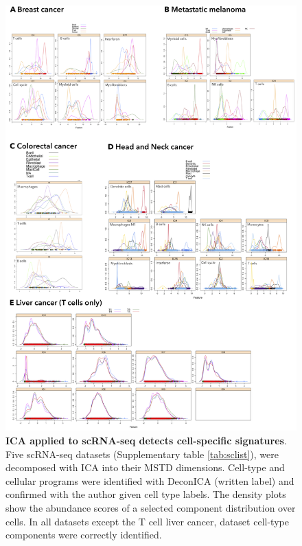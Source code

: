\documentclass[12pt,]{book}
\theoremstyle{definition}
\theoremstyle{definition}
\theoremstyle{definition}
\theoremstyle{remark}
\begin{document}
\begin{figure}

{\centering \includegraphics[width=1\linewidth]{figures-ext/scICA} 

}

\caption[ICA applied to scRNA-seq detects cell-specific signautures]{\textbf{ICA applied to scRNA-seq detects
cell-specific signatures}. Five scRNA-seq datasets (Supplementary table
\ref{tab:sclist}), were decomposed with ICA into their MSTD
\citep{Kairov2017} dimensions. Cell-type and cellular programs were
identified with DeconICA (written label) and confirmed with the author
given cell type labels. The density plots show the abundance scores of a
selected component distribution over cells. In all datasets except the T
cell liver cancer, dataset cell-type components were correctly
identified.}\label{fig:scICA}
\end{figure}
\end{document}
